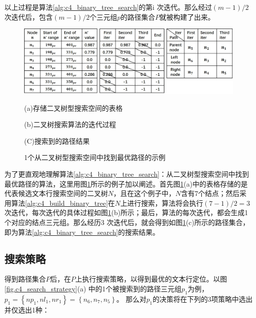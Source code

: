         以上过程是算法\ref{alg:c4_binary_tree_search}的第i 次迭代。那么经过$(m-1)/2$次迭代后，包含$(m-1)/2$个三元组$p$的路径集合$P$就被构建了出来。

        \begin{figure}[htbp]
        \centering
        \includegraphics[width=\textwidth]{./figures/c4_bianry_tree_search.jpg}
        \begin{minipage}[t]{0.33\linewidth}
        \centerline{\small (a)存储二叉树型搜索空间的表格}
        \end{minipage}
        \begin{minipage}[t]{0.33\linewidth}
        \centerline{\small(b)二叉树搜索算法的迭代过程}
        \end{minipage}
        \begin{minipage}[t]{0.26\linewidth}
        \centerline{\small(C)搜索到的路径结果}
        \end{minipage}
        \caption{1个从二叉树型搜索空间中找到最优路径的示例}
        \label{fig.c4_bianry_tree_search}
        \end{figure}

        为了更直观地理解算法\ref{alg:c4_binary_tree_search}：从二叉树型搜索空间中找到最优路径的算法，这里用图\ref{fig.c4_bianry_tree_search}所示的例子加以阐述。首先图\ref{fig.c4_bianry_tree_search}(a)中的表格存储的是代表候选文本行搜索空间的二叉树$N$，且在这个例子中，$N$含有7个结点；然后采用算法\ref{alg:c4_build_binary_tree}在$N$上进行搜索，算法将会执行$(7-1)/2=3$ 次迭代，每次迭代的具体过程如图\ref{fig.c4_bianry_tree_search}(b)所示；最后，算法的每次迭代，都会生成1个对应的结点三元组。那么经历3 次迭代后，就会得到如图\ref{fig.c4_bianry_tree_search}(c)所示的路径集合，即为算法\ref{alg:c4_binary_tree_search}的搜索结果。

        \subsection{搜索策略}

        得到路径集合$P$后，在$P$上执行搜索策略，以得到最优的文本行定位。以图\ref{fig.c4_search_strategy}(a) 中的1个被搜索到的路径三元组$p_1$为例，$p_1=\left\{np_1,nl_1,nr_1\right\}=\left\{n_6,n_7,n_5\right\}$。 那么对$p_1$的决策将在下列的3项策略中选出并仅选出1种：
        

